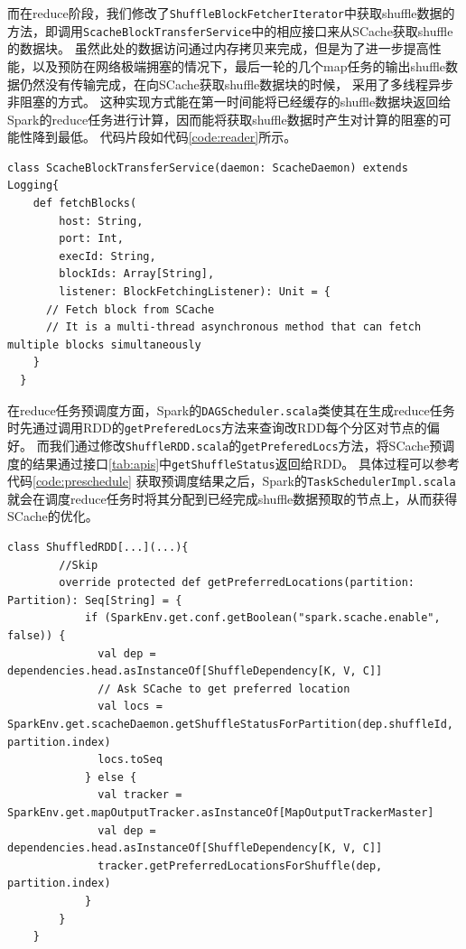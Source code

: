 而在reduce阶段，我们修改了\verb|ShuffleBlockFetcherIterator|中获取shuffle数据的方法，即调用\verb|ScacheBlockTransferService|中的相应接口来从SCache获取shuffle的数据块。
虽然此处的数据访问通过内存拷贝来完成，但是为了进一步提高性能，以及预防在网络极端拥塞的情况下，最后一轮的几个map任务的输出shuffle数据仍然没有传输完成，在向SCache获取shuffle数据块的时候，
采用了多线程异步非阻塞的方式。
这种实现方式能在第一时间能将已经缓存的shuffle数据块返回给Spark的reduce任务进行计算，因而能将获取shuffle数据时产生对计算的阻塞的可能性降到最低。
代码片段如代码\ref{code:reader}所示。

\begin{lstlisting}[style={myScalastyle}, caption={ScacheBlockTransferService代码片段}, label={code:reader}]
  class ScacheBlockTransferService(daemon: ScacheDaemon) extends Logging{
    def fetchBlocks(
        host: String,
        port: Int,
        execId: String,
        blockIds: Array[String],
        listener: BlockFetchingListener): Unit = {
      // Fetch block from SCache
      // It is a multi-thread asynchronous method that can fetch multiple blocks simultaneously
    }
  }
\end{lstlisting}

在reduce任务预调度方面，Spark的\verb|DAGScheduler.scala|类使其在生成reduce任务时先通过调用RDD的\verb|getPreferedLocs|方法来查询改RDD每个分区对节点的偏好。
而我们通过修改\verb|ShuffleRDD.scala|的\verb|getPreferedLocs|方法，将SCache预调度的结果通过接口\ref{tab:apis}中\verb|getShuffleStatus|返回给RDD。
具体过程可以参考代码\ref{code:preschedule}
获取预调度结果之后，Spark的\verb|TaskSchedulerImpl.scala|就会在调度reduce任务时将其分配到已经完成shuffle数据预取的节点上，从而获得SCache的优化。

\begin{lstlisting}[style={myScalastyle}, caption={Reduce预调度代码片段}, label={code:preschedule}]
    class ShuffledRDD[...](...){
        //Skip
        override protected def getPreferredLocations(partition: Partition): Seq[String] = {
            if (SparkEnv.get.conf.getBoolean("spark.scache.enable", false)) {
              val dep = dependencies.head.asInstanceOf[ShuffleDependency[K, V, C]]
              // Ask SCache to get preferred location
              val locs = SparkEnv.get.scacheDaemon.getShuffleStatusForPartition(dep.shuffleId, partition.index)
              locs.toSeq
            } else {
              val tracker = SparkEnv.get.mapOutputTracker.asInstanceOf[MapOutputTrackerMaster]
              val dep = dependencies.head.asInstanceOf[ShuffleDependency[K, V, C]]
              tracker.getPreferredLocationsForShuffle(dep, partition.index)
            }
        }
    }
\end{lstlisting}

